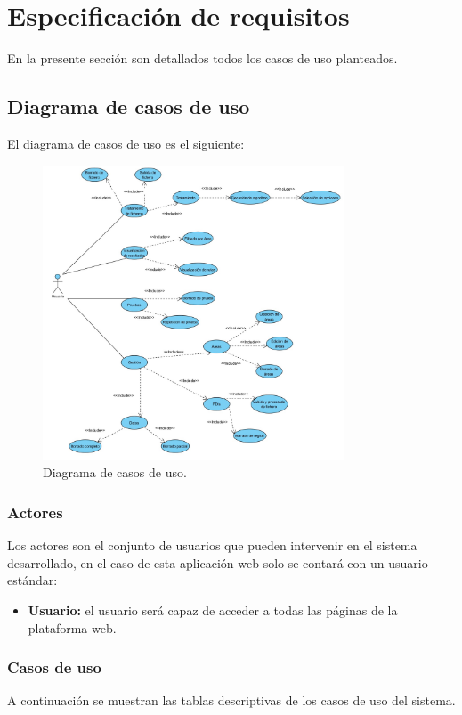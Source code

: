 \section{Especificación de requisitos}
En la presente sección son detallados todos los casos de uso planteados.

\subsection{Diagrama de casos de uso}
El diagrama de casos de uso es el siguiente:

\begin{figure}[!htbp]
  \centering
    \includegraphics[width=0.8\textwidth]{../img/uml/casouso.png}
  \caption{Diagrama de casos de uso.}
  \label{casouso}
\end{figure}

\subsubsection{Actores}
Los actores son el conjunto de usuarios que pueden intervenir en el sistema desarrollado, en el caso  de esta aplicación web solo se contará con un usuario estándar:

\begin{itemize}
	\item \textbf{Usuario:} el usuario será capaz de acceder a todas las páginas de la plataforma web.
\end{itemize}


\subsubsection{Casos de uso}
A continuación se muestran las tablas descriptivas de los casos de uso del sistema.

